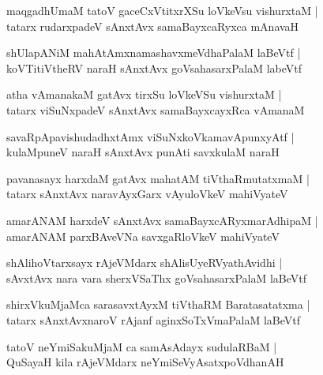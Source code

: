 \documentclass[twoside,12pt,openright]{book}
\newcounter{shloka}[chapter]
\begin{document}
\begin{shloka}
maqgadhUmaM tatoV gaceCxVtitxrXSu loVkeVsu vishurxtaM |\\
tatarx rudarxpadeV sAnxtAvx samaBayxcaRyxca mAnavaH 
\end{shloka}

\begin{shloka}
shUlapANiM mahAtAmxnamashavxmeVdhaPalaM laBeVtf |\\
koVTitiVtheRV naraH sAnxtAvx goVsahasarxPalaM labeVtf 
\end{shloka}

\begin{shloka}
atha vAmanakaM gatAvx tirxSu loVkeVSu vishurxtaM |\\
tatarx viSuNxpadeV sAnxtAvx samaBayxcayxRca vAmanaM 
\end{shloka}

\begin{shloka}
savaRpApavishudadhxtAmx viSuNxkoVkamavApunxyAtf |\\
kulaMpuneV naraH sAnxtAvx punAti savxkulaM naraH 
\end{shloka}

\begin{shloka}
pavanasayx harxdaM gatAvx mahatAM tiVthaRmutatxmaM |\\
tatarx sAnxtAvx naravAyxGarx vAyuloVkeV mahiVyateV 
\end{shloka}


\begin{shloka}
amarANAM harxdeV sAnxtAvx samaBayxcARyxmarAdhipaM |\\
amarANAM parxBAveVNa savxgaRloVkeV mahiVyateV  
\end{shloka}

\begin{shloka}
shAlihoVtarxsayx rAjeVMdarx shAlisUyeRVyathAvidhi |\\
sAvxtAvx nara vara sherxVSaThx goVsahasarxPalaM laBeVtf 
\end{shloka}

\begin{shloka}
shirxVkuMjaMca sarasavxtAyxM tiVthaRM Baratasatatxma |\\
tatarx sAnxtAvxnaroV rAjanf aginxSoTxVmaPalaM laBeVtf 
\end{shloka}

\begin{shloka}
tatoV neYmiSakuMjaM ca samAsAdayx sudulaRBaM |\\
QuSayaH kila rAjeVMdarx neYmiSeVyAsatxpoVdhanAH 
\end{shloka}
\end{document}
